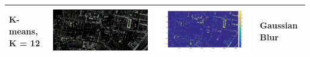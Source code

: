 \documentclass[fleqn,10pt]{SelfArx} %
\begin{document}
\begin{table}
\begin{tabular}{>{\centering\arraybackslash}M{8mm}cc>{\centering\arraybackslash}M{20mm}}
\midrule
\vspace{-3cm}
\hspace{-0.6cm}
K-means, K = 12 & \includegraphics[clip,scale=0.07]{12rgb.jpg} & \includegraphics[trim={6cm 2.5cm 4.5cm 1.6cm},clip,scale=0.18]{12.jpg} & \vspace{-3cm}Gaussian Blur \\ 
\bottomrule
\end{tabular} 
\end{table}
\end{document}
